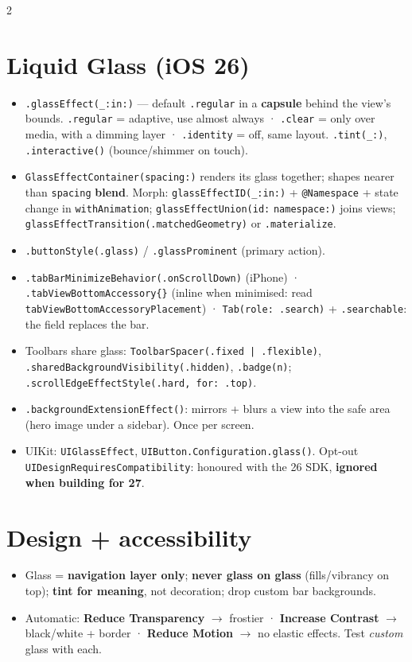 \documentclass[8pt]{extarticle}
\begin{document}
\begin{multicols}{2}
\raggedright

\section{Liquid Glass (iOS 26)}
\begin{itemize}
  \item \texttt{.glassEffect(\_:in:)} — default \texttt{.regular} in a \textbf{capsule} behind
        the view's bounds. \texttt{.regular} = adaptive, use almost always · \texttt{.clear} =
        only over media, with a dimming layer · \texttt{.identity} = off, same layout.
        \texttt{.tint(\_:)}, \texttt{.interactive()} (bounce/shimmer on touch).
  \item \texttt{GlassEffectContainer(spacing:)} renders its glass together; shapes nearer than
        \texttt{spacing} \textbf{blend}. Morph: \texttt{glassEffectID(\_:in:)} + \texttt{@Namespace}
        + state change in \texttt{withAnimation}; \texttt{glassEffectUnion(id:}\allowbreak
        \texttt{namespace:)} joins views; \texttt{glassEffectTransition(.matchedGeometry)}
        or \texttt{.materialize}.
  \item \texttt{.buttonStyle(.glass)} / \texttt{.glassProminent} (primary action).
  \item \texttt{.tabBarMinimizeBehavior(.onScrollDown)} (iPhone) ·
        \texttt{.tabViewBottomAccessory\{\}} (inline when minimised: read
        \texttt{tabViewBottomAccessoryPlacement}) · \texttt{Tab(role: .search)} +
        \texttt{.searchable}: the field replaces the bar.
  \item Toolbars share glass: \texttt{ToolbarSpacer(.fixed | .flexible)},
        \texttt{.sharedBackground}\allowbreak\texttt{Visibility(.hidden)}, \texttt{.badge(n)};
        \texttt{.scrollEdgeEffectStyle(.hard, for: .top)}.
  \item \texttt{.backgroundExtensionEffect()}: mirrors + blurs a view into the safe area
        (hero image under a sidebar). Once per screen.
  \item UIKit: \texttt{UIGlassEffect}, \texttt{UIButton.Configuration.glass()}. Opt-out
        \texttt{UIDesign}\allowbreak\texttt{RequiresCompatibility}: honoured with the 26 SDK,
        \textbf{ignored when building for 27}.
\end{itemize}

\section{Design + accessibility}
\begin{itemize}
  \item Glass = \textbf{navigation layer only}; \textbf{never glass on glass} (fills/vibrancy on
        top); \textbf{tint for meaning}, not decoration; drop custom bar backgrounds.
  \item Automatic: \textbf{Reduce Transparency} $\to$ frostier · \textbf{Increase Contrast}
        $\to$ black/white + border · \textbf{Reduce Motion} $\to$ no elastic effects. Test
        \emph{custom} glass with each.
\end{itemize}


\end{multicols}
\end{document}
